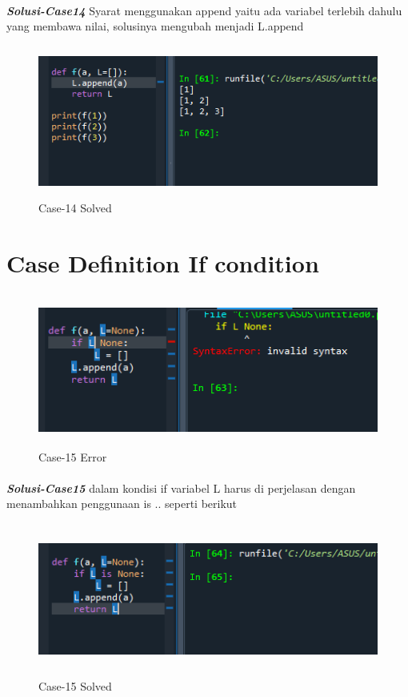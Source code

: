 \documentclass[12pt,a4paper]{article}
\begin{document}
\paragraph{}\textbf{\textit{Solusi-Case14}} {Syarat menggunakan append yaitu ada variabel terlebih dahulu yang membawa nilai, solusinya mengubah menjadi L.append}
\begin{figure}[ht]
    \centerline{\includegraphics[width=15cm,height=5cm]{image/case14-solved.png}}
    \renewcommand{\figurename}{Gambar}
    \caption{Case-14 Solved}
\end{figure}

\newpage
\section{Case Definition If condition}
\begin{figure}[ht]
    \centerline{\includegraphics[width=15cm,height=5cm]{image/case15.png}}
    \renewcommand{\figurename}{Gambar}
    \caption{Case-15 Error}
\end{figure}
\paragraph{}\textbf{\textit{Solusi-Case15}} {dalam kondisi if variabel L harus di perjelasan dengan menambahkan penggunaan is .. seperti berikut}
\begin{figure}[ht]
    \centerline{\includegraphics[width=15cm,height=5cm]{image/case15-solved.png}}
    \renewcommand{\figurename}{Gambar}
    \caption{Case-15 Solved}
\end{figure}
\end{document}
